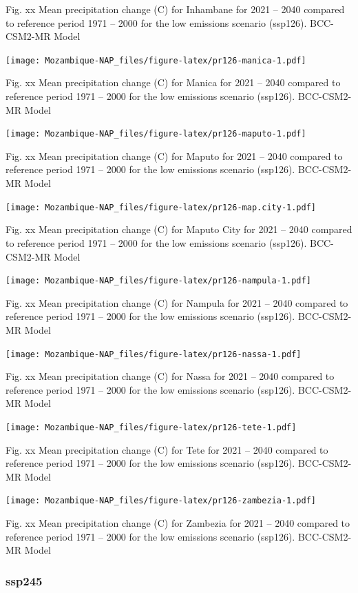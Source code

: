 \documentclass[
]{book}
\begin{document}
Fig. xx Mean precipitation change (C) for Inhambane for 2021 -- 2040 compared to reference period 1971 -- 2000 for the low emissions scenario (ssp126). BCC-CSM2-MR Model

\texttt{[image: Mozambique-NAP\_files/figure-latex/pr126-manica-1.pdf]}

Fig. xx Mean precipitation change (C) for Manica for 2021 -- 2040 compared to reference period 1971 -- 2000 for the low emissions scenario (ssp126). BCC-CSM2-MR Model

\texttt{[image: Mozambique-NAP\_files/figure-latex/pr126-maputo-1.pdf]}

Fig. xx Mean precipitation change (C) for Maputo for 2021 -- 2040 compared to reference period 1971 -- 2000 for the low emissions scenario (ssp126). BCC-CSM2-MR Model

\texttt{[image: Mozambique-NAP\_files/figure-latex/pr126-map.city-1.pdf]}

Fig. xx Mean precipitation change (C) for Maputo City for 2021 -- 2040 compared to reference period 1971 -- 2000 for the low emissions scenario (ssp126). BCC-CSM2-MR Model

\texttt{[image: Mozambique-NAP\_files/figure-latex/pr126-nampula-1.pdf]}

Fig. xx Mean precipitation change (C) for Nampula for 2021 -- 2040 compared to reference period 1971 -- 2000 for the low emissions scenario (ssp126). BCC-CSM2-MR Model

\texttt{[image: Mozambique-NAP\_files/figure-latex/pr126-nassa-1.pdf]}

Fig. xx Mean precipitation change (C) for Nassa for 2021 -- 2040 compared to reference period 1971 -- 2000 for the low emissions scenario (ssp126). BCC-CSM2-MR Model

\texttt{[image: Mozambique-NAP\_files/figure-latex/pr126-tete-1.pdf]}

Fig. xx Mean precipitation change (C) for Tete for 2021 -- 2040 compared to reference period 1971 -- 2000 for the low emissions scenario (ssp126). BCC-CSM2-MR Model

\texttt{[image: Mozambique-NAP\_files/figure-latex/pr126-zambezia-1.pdf]}

Fig. xx Mean precipitation change (C) for Zambezia for 2021 -- 2040 compared to reference period 1971 -- 2000 for the low emissions scenario (ssp126). BCC-CSM2-MR Model

\hypertarget{ssp245-1}{%
\subsubsection{ssp245}\label{ssp245-1}}
\end{document}
